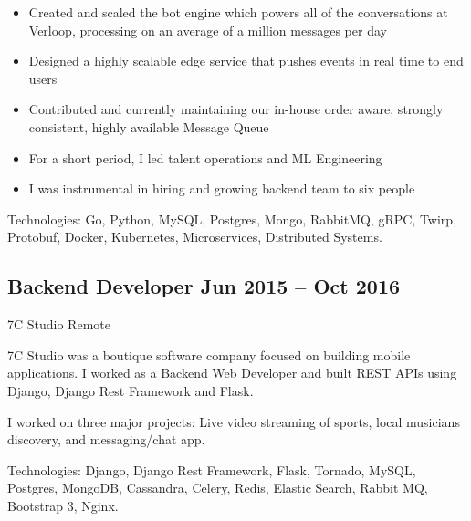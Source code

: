 \documentclass[a4,10pt]{article}
\newcommand{\subtext}[1]{
#1\par\vspace{-0.2cm}}
\newenvironment{zitemize}{
\begin{itemize}\itemsep0pt \parskip0pt \parsep1pt}
{\end{itemize}\vspace{-0.5cm}}
\begin{document}
    \begin{zitemize}
        \item Created and scaled the bot engine which powers all of the conversations at Verloop,  processing on an average of a million messages per day
        \item Designed a highly scalable edge service that pushes events in real time to end users
        \item Contributed and currently maintaining our in-house order aware, strongly consistent, highly available Message Queue 
        \item For a short period, I led talent operations and ML Engineering
        \item I was instrumental in hiring and growing backend team to six people
    \end{zitemize}

\begin{flushleft}
Technologies: Go, Python, MySQL, Postgres, Mongo, RabbitMQ, gRPC, Twirp, Protobuf, Docker, Kubernetes, Microservices, Distributed Systems.
\end{flushleft}

\subsection*{Backend Developer \hfill Jun 2015 – Oct 2016} 
\subtext{7C Studio \hfill Remote} 
\begin{flushleft}
7C Studio was a boutique software company focused on building mobile applications. I worked as a Backend Web Developer and built REST APIs using Django, Django Rest Framework and Flask. 
\end{flushleft}
\begin{flushleft}
I worked on three major projects: Live video streaming of sports, local musicians discovery, and messaging/chat app.
\end{flushleft}
\begin{flushleft}
Technologies: Django, Django Rest Framework, Flask, Tornado, MySQL, Postgres, MongoDB, Cassandra, Celery, Redis, Elastic Search, Rabbit MQ, Bootstrap 3, Nginx.
\end{flushleft}

\end{document}
